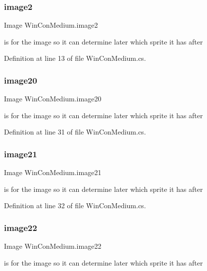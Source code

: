 \subsubsection{\texorpdfstring{image2}{image2}}
{\footnotesize\ttfamily Image Win\+Con\+Medium.\+image2}

is for the image so it can determine later which sprite it has after 

Definition at line 13 of file Win\+Con\+Medium.\+cs.

\mbox{\label{class_win_con_medium_ade09bf415ec0571a7a10157e458b9486}} 
\subsubsection{\texorpdfstring{image20}{image20}}
{\footnotesize\ttfamily Image Win\+Con\+Medium.\+image20}

is for the image so it can determine later which sprite it has after 

Definition at line 31 of file Win\+Con\+Medium.\+cs.

\mbox{\label{class_win_con_medium_aa2556229ff76450bc57542bf4c5df3e3}} 
\subsubsection{\texorpdfstring{image21}{image21}}
{\footnotesize\ttfamily Image Win\+Con\+Medium.\+image21}

is for the image so it can determine later which sprite it has after 

Definition at line 32 of file Win\+Con\+Medium.\+cs.

\mbox{\label{class_win_con_medium_a1532c90386f312644ce849bbf1406f18}} 
\subsubsection{\texorpdfstring{image22}{image22}}
{\footnotesize\ttfamily Image Win\+Con\+Medium.\+image22}

is for the image so it can determine later which sprite it has after 


